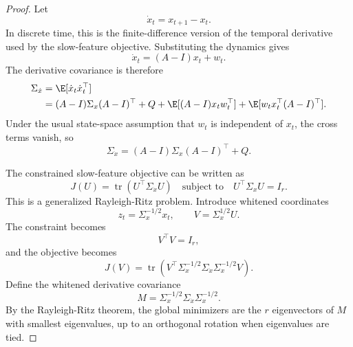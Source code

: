 \begin{proof}
Let
\begin{equation}
    \dot{x}_t = x_{t+1}-x_t.
\end{equation}
In discrete time, this is the finite-difference version of the temporal
derivative used by the slow-feature objective. Substituting the dynamics gives
\begin{equation}
    \dot{x}_t = (A-I)x_t+w_t.
\end{equation}
The derivative covariance is therefore
\begin{align}
    \Sigma_{\dot{x}}
    &=
    \E[\dot{x}_t\dot{x}_t^\top] \\
    &=
    (A-I)\Sigma_x(A-I)^\top
    + Q
    + \E[(A-I)x_t w_t^\top]
    + \E[w_t x_t^\top(A-I)^\top].
\end{align}
Under the usual state-space assumption that $w_t$ is independent of $x_t$, the
cross terms vanish, so
\begin{equation}
    \Sigma_{\dot{x}} = (A-I)\Sigma_x(A-I)^\top + Q.
    \label{eq:derivative_covariance}
\end{equation}

The constrained slow-feature objective can be written as
\begin{equation}
    J(U) = \operatorname{tr}(U^\top \Sigma_{\dot{x}} U)
    \quad
    \text{subject to}
    \quad
    U^\top \Sigma_x U = I_r.
    \label{eq:sfa_trace_objective}
\end{equation}
This is a generalized Rayleigh-Ritz problem. Introduce whitened coordinates
\begin{equation}
    z_t = \Sigma_x^{-1/2} x_t,
    \qquad
    V = \Sigma_x^{1/2} U.
\end{equation}
The constraint becomes
\begin{equation}
    V^\top V = I_r,
\end{equation}
and the objective becomes
\begin{equation}
    J(V)
    =
    \operatorname{tr}\left(
        V^\top
        \Sigma_x^{-1/2}\Sigma_{\dot{x}}\Sigma_x^{-1/2}
        V
    \right).
\end{equation}
Define the whitened derivative covariance
\begin{equation}
    M = \Sigma_x^{-1/2}\Sigma_{\dot{x}}\Sigma_x^{-1/2}.
\end{equation}
By the Rayleigh-Ritz theorem, the global minimizers are the $r$ eigenvectors of
$M$ with smallest eigenvalues, up to an orthogonal rotation when eigenvalues
are tied.


\end{proof}
